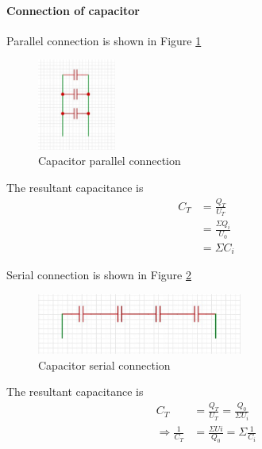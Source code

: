         \paragraph{Connection of capacitor}
            Parallel connection is shown in Figure \ref{capa_para_conn}
            \begin{figure}[H]
                \begin{center}
                    \includegraphics[height=3cm]{electromagnetism_charts/capa_para_conn.eps}
                \end{center}
                \caption{Capacitor parallel connection}
                \label{capa_para_conn}
            \end{figure}

            The resultant capacitance is
            \begin{align}
                C_T &= \frac{Q_T}{U_T} \\
                         &= \frac{\Sigma Q_i}{U_0} \\
                         &= \Sigma C_i
            \end{align}

            Serial connection is shown in Figure \ref{capa_seri_conn}

            \begin{figure}[H]
                \begin{center}
                    \includegraphics[height=2cm]{electromagnetism_charts/capa_seri_conn.eps}
                \end{center}
                \caption{Capacitor serial connection}
                \label{capa_seri_conn}
            \end{figure}

            The resultant capacitance is
            \begin{align}
                C_T &= \frac{Q_T}{U_T} = \frac{Q_0}{\Sigma U_i} \\
                \Rightarrow \frac{1}{C_T} &= \frac{\Sigma Ui}{Q_0} = \Sigma \frac{1}{C_i}
            \end{align}

